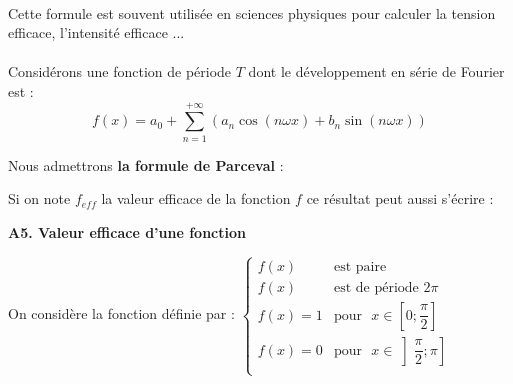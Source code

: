 \documentclass[11pt,a4paper]{article}
\begin{document}
\\[3 mm]

\begin{center}

\end{center}
\vspace{5mm}

Cette formule est souvent utilisée en sciences physiques pour calculer la tension efficace, l'intensité efficace ... \\[5 mm]

\\[3 mm]
Considérons une fonction de période $T$ dont le développement en série de Fourier est : $$f(x)=a_0+ \sum\limits_{n=1}^{+\infty}\left(a_n\cos(n\omega x) + b_n \sin (n\omega x)\right)$$

Nous admettrons \textbf{la formule de Parceval} : \\

\begin{center}

\end{center}
\vspace{5 mm}
Si on note $f_{eff}$ la valeur efficace de la fonction $f$ ce résultat peut aussi s'écrire :

\begin{center}
\end{center}

\newpage

\textbf{A5. Valeur efficace d'une fonction}

On considère la fonction définie par : 
$\begin{cases}
    f(x)&\textrm  {est paire}\\
   	f(x)&\textrm {est de période }2\pi \\
	f(x)=1  & \textrm {pour~~} x \in \left[0;\dfrac{\pi}{2} \right]\\
	f(x)=0  & \textrm {pour~~} x \in \left]\dfrac{\pi}{2};\pi \right]\\
\end{cases}$
\end{document}
